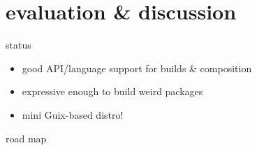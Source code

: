 \documentclass{beamer}
\begin{document}
\section{evaluation \& discussion}

\begin{frame}{status}
  \begin{itemize}
  \item good API/language support for builds \& composition
  \item expressive enough to build weird packages
  \item<2-> mini Guix-based distro!
  \end{itemize}
\end{frame}

\begin{frame}{road map}
\end{frame}





\end{document}
